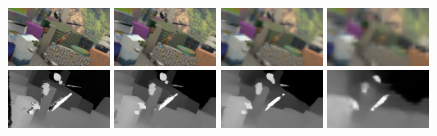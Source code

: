 \documentclass[runningheads]{llncs}
\begin{document}
\begin{figure}[!htbp]
    \begin{center}
        \includegraphics[width=0.24\textwidth,clip]{figures/imL_0.png}
        \includegraphics[width=0.24\textwidth,clip]{figures/imL_1.png}
        \includegraphics[width=0.24\textwidth,clip]{figures/imL_2.png}
        \includegraphics[width=0.24\textwidth,clip]{figures/imL_3.png}
        \\
        \includegraphics[width=0.24\textwidth,clip]{figures/pred_0.png}
        \includegraphics[width=0.24\textwidth,clip]{figures/pred_1.png}
        \includegraphics[width=0.24\textwidth,clip]{figures/pred_2.png}
        \includegraphics[width=0.24\textwidth,clip]{figures/pred_3.png}

\end{center}
\end{figure}
\end{document}
